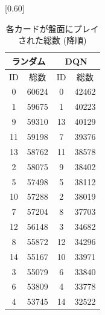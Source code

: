 \documentclass[twocolumn]{jarticle}
\begin{document}
  \begin{table}[t]
    \centering
    \caption{各カードが盤面にプレイされた総数 (降順)}
    \vspace{-0.3cm}
    \label{table:cardcount}
    \scalebox{0.70}[0.60]{
      \begin{tabular}{|cc|cc|}
        \hline
        \multicolumn{2}{|c|}{ランダム}       & \multicolumn{2}{c|}{DQN}       \\ \hline
        \multicolumn{1}{|c|}{ID} & 総数    & \multicolumn{1}{c|}{ID} & 総数   \\ \hline \hline
        \multicolumn{1}{|c|}{0}  & 60624 & \multicolumn{1}{c|}{0}  & 42462 \\ \hline
        \multicolumn{1}{|c|}{1}  & 59675 & \multicolumn{1}{c|}{1} & 40223 \\ \hline
        \multicolumn{1}{|c|}{9}  & 59310 & \multicolumn{1}{c|}{13}  & 40129 \\ \hline
        \multicolumn{1}{|c|}{11} & 59198 & \multicolumn{1}{c|}{7}  & 39376 \\ \hline
        \multicolumn{1}{|c|}{13} & 58762 & \multicolumn{1}{c|}{11} & 38578 \\ \hline
        \multicolumn{1}{|c|}{2}  & 58075 & \multicolumn{1}{c|}{9}  & 38402 \\ \hline
        \multicolumn{1}{|c|}{5}  & 57498 & \multicolumn{1}{c|}{5}  & 38112 \\ \hline
        \multicolumn{1}{|c|}{10}  & 57288 & \multicolumn{1}{c|}{2}  & 38019 \\ \hline
        \multicolumn{1}{|c|}{7} & 57204 & \multicolumn{1}{c|}{8}  & 37703 \\ \hline
        \multicolumn{1}{|c|}{12} & 56148 & \multicolumn{1}{c|}{3}  & 34682 \\ \hline
        \multicolumn{1}{|c|}{8}  & 55872 & \multicolumn{1}{c|}{12} & 34296 \\ \hline
        \multicolumn{1}{|c|}{14}  & 55167 & \multicolumn{1}{c|}{10}  & 33971 \\ \hline
        \multicolumn{1}{|c|}{3} & 55079 & \multicolumn{1}{c|}{6}  & 33840 \\ \hline
        \multicolumn{1}{|c|}{6}  & 53809 & \multicolumn{1}{c|}{4} & 33778 \\ \hline
        \multicolumn{1}{|c|}{4}  & 53745 & \multicolumn{1}{c|}{14} & 32522 \\ \hline
        \end{tabular}
    }
    \end{table}
\end{document}
